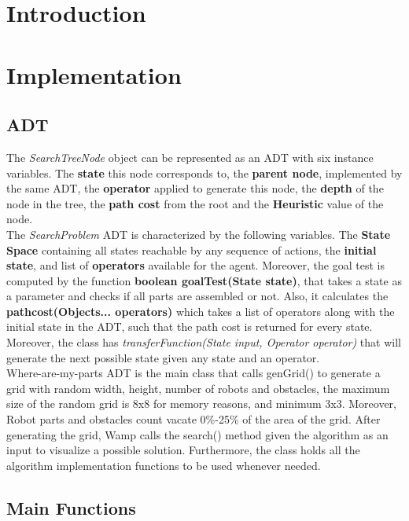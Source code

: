 \chapter{Introduction}



\chapter{Implementation}


\section{ADT}
The \textit{SearchTreeNode} object can be represented as an ADT with six instance variables. The \textbf{state} this node corresponds to, the \textbf{parent node}, implemented by the same ADT, the \textbf{operator} applied to generate this node, the \textbf{depth} of the node in the tree, the \textbf{path cost} from the root and the \textbf{Heuristic} value of the node.\\

The \textit{SearchProblem} ADT is characterized by the following variables. The \textbf{State Space} containing all states reachable by any sequence of actions, the \textbf{initial state}, and list of \textbf{operators} available for the agent. Moreover, the goal test is computed by the function \textbf{boolean goalTest(State state)}, that takes a state as a parameter and checks if all parts are assembled or not. Also, it calculates the \textbf{pathcost(Objects... operators)} which takes a list of operators along with the initial state in the ADT, such that the path cost is returned for every state. Moreover, the class has \textit{transferFunction(State input, Operator operator)} that will generate the next possible state given any state and an operator.\\

Where-are-my-parts ADT is the main class that calls genGrid() to generate a grid with random width, height, number of robots and obstacles, the maximum size of the random grid is 8x8 for memory reasons, and minimum 3x3. Moreover, Robot parts and obstacles count vacate 0\%-25\% of the area of the grid. After generating the grid, Wamp calls the search() method given the algorithm as an input to visualize a possible solution. Furthermore, the class holds all the algorithm implementation functions to be used whenever needed.

\section{Main Functions}
